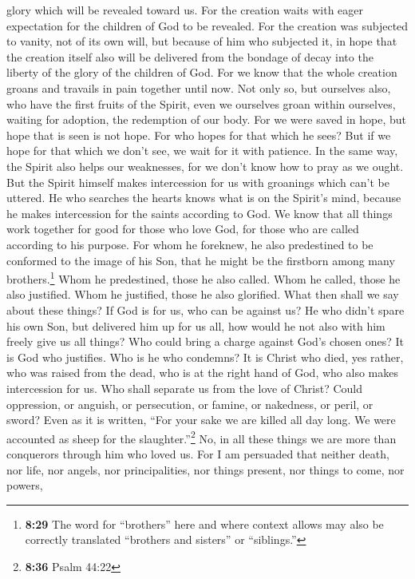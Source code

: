 glory which will be revealed toward us.  For the creation
waits with eager expectation for the children of God to be revealed.
 For the creation was subjected to vanity, not of its own
will, but because of him who subjected it, in hope  that
the creation itself also will be delivered from the bondage of decay
into the liberty of the glory of the children of God. 
For we know that the whole creation groans and travails in pain together
until now.  Not only so, but ourselves also, who have the
first fruits of the Spirit, even we ourselves groan within ourselves,
waiting for adoption, the redemption of our body.  For we
were saved in hope, but hope that is seen is not hope. For who hopes for
that which he sees?  But if we hope for that which we
don't see, we wait for it with patience.  In the same
way, the Spirit also helps our weaknesses, for we don't know how to pray
as we ought. But the Spirit himself makes intercession for us with
groanings which can't be uttered.  He who searches the
hearts knows what is on the Spirit's mind, because he makes intercession
for the saints according to God.  We know that all things
work together for good for those who love God, for those who are called
according to his purpose.  For whom he foreknew, he also
predestined to be conformed to the image of his Son, that he might be
the firstborn among many brothers.\footnote{\textbf{8:29} The word for
  ``brothers'' here and where context allows may also be correctly
  translated ``brothers and sisters'' or ``siblings.''} 
Whom he predestined, those he also called. Whom he called, those he also
justified. Whom he justified, those he also glorified. 
What then shall we say about these things? If God is for us, who can be
against us?  He who didn't spare his own Son, but
delivered him up for us all, how would he not also with him freely give
us all things?  Who could bring a charge against God's
chosen ones? It is God who justifies.  Who is he who
condemns? It is Christ who died, yes rather, who was raised from the
dead, who is at the right hand of God, who also makes intercession for
us.  Who shall separate us from the love of Christ? Could
oppression, or anguish, or persecution, or famine, or nakedness, or
peril, or sword?  Even as it is written, ``For your sake
we are killed all day long. We were accounted as sheep for the
slaughter.''\footnote{\textbf{8:36} Psalm 44:22}  No, in
all these things we are more than conquerors through him who loved us.
 For I am persuaded that neither death, nor life, nor
angels, nor principalities, nor things present, nor things to come, nor
powers,

